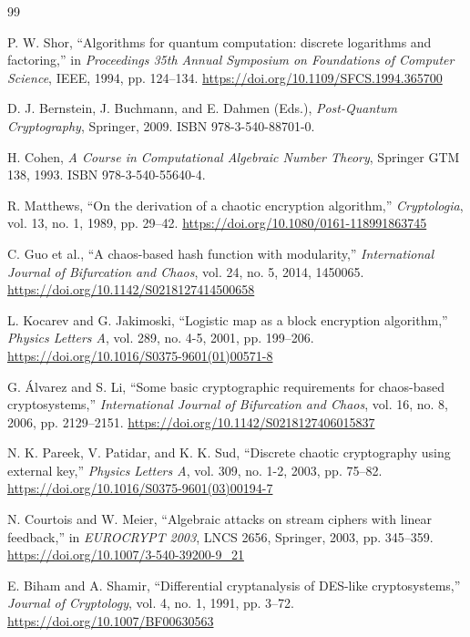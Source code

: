 \documentclass[11pt,a4paper]{article}
\theoremstyle{plain}
\theoremstyle{definition}
\theoremstyle{remark}
\begin{document}
\begin{thebibliography}{99}

P. W. Shor, ``Algorithms for quantum computation: discrete logarithms and factoring,'' in \textit{Proceedings 35th Annual Symposium on Foundations of Computer Science}, IEEE, 1994, pp. 124--134. \url{https://doi.org/10.1109/SFCS.1994.365700}

D. J. Bernstein, J. Buchmann, and E. Dahmen (Eds.), \textit{Post-Quantum Cryptography}, Springer, 2009. ISBN 978-3-540-88701-0.

H. Cohen, \textit{A Course in Computational Algebraic Number Theory}, Springer GTM 138, 1993. ISBN 978-3-540-55640-4.

R. Matthews, ``On the derivation of a chaotic encryption algorithm,'' \textit{Cryptologia}, vol. 13, no. 1, 1989, pp. 29--42. \url{https://doi.org/10.1080/0161-118991863745}

C. Guo et al., ``A chaos-based hash function with modularity,'' \textit{International Journal of Bifurcation and Chaos}, vol. 24, no. 5, 2014, 1450065. \url{https://doi.org/10.1142/S0218127414500658}

L. Kocarev and G. Jakimoski, ``Logistic map as a block encryption algorithm,'' \textit{Physics Letters A}, vol. 289, no. 4-5, 2001, pp. 199--206. \url{https://doi.org/10.1016/S0375-9601(01)00571-8}

G. \'{A}lvarez and S. Li, ``Some basic cryptographic requirements for chaos-based cryptosystems,'' \textit{International Journal of Bifurcation and Chaos}, vol. 16, no. 8, 2006, pp. 2129--2151. \url{https://doi.org/10.1142/S0218127406015837}

N. K. Pareek, V. Patidar, and K. K. Sud, ``Discrete chaotic cryptography using external key,'' \textit{Physics Letters A}, vol. 309, no. 1-2, 2003, pp. 75--82. \url{https://doi.org/10.1016/S0375-9601(03)00194-7}

N. Courtois and W. Meier, ``Algebraic attacks on stream ciphers with linear feedback,'' in \textit{EUROCRYPT 2003}, LNCS 2656, Springer, 2003, pp. 345--359. \url{https://doi.org/10.1007/3-540-39200-9_21}

E. Biham and A. Shamir, ``Differential cryptanalysis of DES-like cryptosystems,'' \textit{Journal of Cryptology}, vol. 4, no. 1, 1991, pp. 3--72. \url{https://doi.org/10.1007/BF00630563}


\end{thebibliography}
\end{document}
